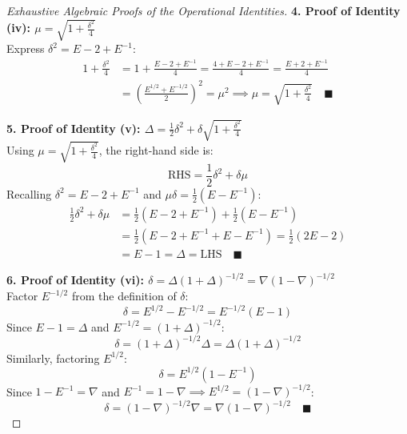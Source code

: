 \begin{proof}[Exhaustive Algebraic Proofs of the Operational Identities]
\medskip
\noindent\textbf{4. Proof of Identity (iv): $\mu = \sqrt{1 + \frac{\delta^2}{4}}$} \\
Express $\delta^2 = E - 2 + E^{-1}$:
\begin{align}
    1 + \frac{\delta^2}{4} &= 1 + \frac{E - 2 + E^{-1}}{4} = \frac{4 + E - 2 + E^{-1}}{4} = \frac{E + 2 + E^{-1}}{4} \nonumber \\
    &= \left(\frac{E^{1/2} + E^{-1/2}}{2}\right)^2 = \mu^2 \implies \boxed{\mu = \sqrt{1 + \frac{\delta^2}{4}}} \quad \blacksquare
\end{align}

\medskip
\noindent\textbf{5. Proof of Identity (v): $\Delta = \frac{1}{2}\delta^2 + \delta \sqrt{1 + \frac{\delta^2}{4}}$} \\
Using $\mu = \sqrt{1 + \frac{\delta^2}{4}}$, the right-hand side is:
\begin{equation}
    \text{RHS} = \frac{1}{2}\delta^2 + \delta \mu
\end{equation}
Recalling $\delta^2 = E - 2 + E^{-1}$ and $\mu \delta = \frac{1}{2}(E - E^{-1})$:
\begin{align}
    \frac{1}{2}\delta^2 + \delta \mu &= \frac{1}{2}\left(E - 2 + E^{-1}\right) + \frac{1}{2}\left(E - E^{-1}\right) \nonumber \\
    &= \frac{1}{2}\left(E - 2 + E^{-1} + E - E^{-1}\right) = \frac{1}{2}(2E - 2) \nonumber \\
    &= E - 1 = \boxed{\Delta} = \text{LHS} \quad \blacksquare
\end{align}

\medskip
\noindent\textbf{6. Proof of Identity (vi): $\delta = \Delta(1 + \Delta)^{-1/2} = \nabla(1 - \nabla)^{-1/2}$} \\
Factor $E^{-1/2}$ from the definition of $\delta$:
\begin{equation}
    \delta = E^{1/2} - E^{-1/2} = E^{-1/2}(E - 1)
\end{equation}
Since $E - 1 = \Delta$ and $E^{-1/2} = (1 + \Delta)^{-1/2}$:
\begin{equation}
    \delta = (1 + \Delta)^{-1/2} \Delta = \boxed{\Delta(1 + \Delta)^{-1/2}}
\end{equation}
Similarly, factoring $E^{1/2}$:
\begin{equation}
    \delta = E^{1/2}(1 - E^{-1})
\end{equation}
Since $1 - E^{-1} = \nabla$ and $E^{-1} = 1 - \nabla \implies E^{1/2} = (1 - \nabla)^{-1/2}$:
\begin{equation}
    \delta = (1 - \nabla)^{-1/2} \nabla = \boxed{\nabla(1 - \nabla)^{-1/2}} \quad \blacksquare
\end{equation}


\end{proof}
